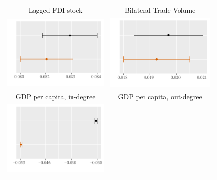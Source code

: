 \documentclass[reqno,onecolumn,letterpaper,12pt]{article}
\begin{document}
\begin{figure}[htp]
\centering
\begin{tabular}{c@{\hskip 0cm}c}
Lagged FDI stock & Bilateral Trade Volume \\
\includegraphics[height=.2\textheight, clip=true, trim=0cm 0cm 0cm .2cm]{draft_figures/plots_pooled/LaggedDV.pdf}    &
\includegraphics[height=.2\textheight, clip=true, trim=0cm 0cm 0cm .2cm]{draft_figures/plots_pooled/TradeVolume.pdf}   \\
GDP per capita, in-degree & GDP per capita, out-degree\\
\includegraphics[height=.2\textheight, clip=true, trim=0cm 0cm 0cm .2cm]{draft_figures/plots_pooled/GDPpc_in.pdf} &

\end{tabular}
\end{figure}
\end{document}
